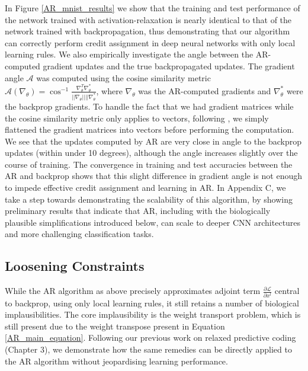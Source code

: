In Figure \ref{AR_mnist_results} we show that the training and test performance of the network trained with activation-relaxation is nearly identical to that of the network trained with backpropagation, thus demonstrating that our algorithm can correctly perform credit assignment in deep neural networks with only local learning rules. We also empirically investigate the angle between the AR-computed gradient updates and the true backpropagated updates. The gradient angle $\mathcal{A}$ was computed using the cosine similarity metric $\mathcal{A}(\nabla_\theta) =  \cos^{-1} \frac{\nabla_\theta^T \nabla_\theta^*}{||\nabla_\theta|| ||\nabla_\theta^*}$, where $\nabla_\theta$ was the AR-computed gradients and $\nabla_\theta^*$ were the backprop gradients. To handle the fact that we had gradient matrices while the cosine similarity metric only applies to vectors, following \citep{lillicrap2016random}, we simply flattened the gradient matrices into vectors before performing the computation. We see that the updates computed by AR are very close in angle to the backprop updates (within under 10 degrees), although the angle increases slightly over the course of training. The convergence in training and test accuracies between the AR and backprop shows that this slight difference in gradient angle is not enough to impede effective credit assignment and learning in AR. In Appendix C, we take a step towards demonstrating the scalability of this algorithm, by showing preliminary results that indicate that AR, including with the biologically plausible simplifications introduced below, can scale to deeper CNN architectures and more challenging classification tasks.

\subsection{Loosening Constraints}

While the AR algorithm as above precisely approximates adjoint term $\frac{\partial \mathcal{L}}{\partial x^l}$ central to backprop, using only local learning rules, it still retains a number of biological implausibilities. The core implausibility is the weight transport problem, which is still present due to the weight transpose present in Equation \ref{AR_main_equation}.  Following our previous work on relaxed predictive coding (Chapter 3), we demonstrate how the same remedies can be directly applied to the AR algorithm without jeopardising learning performance.

